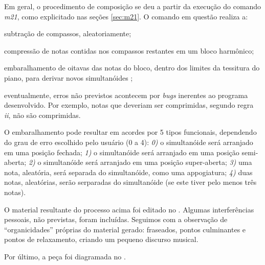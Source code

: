 Em geral, o procedimento de composição se deu a partir da execução do comando \emph{m21}, como explicitado nas seções \ref{sec:m21}. O comando em questão realiza a:\begin{inparaenum}
\item subtração de compassos, aleatoriamente;
\item compressão de notas contidas nos compassos restantes em um bloco harmônico;
\item embaralhamento de oitavas das notas do bloco, dentro dos limites da tessitura do piano, para derivar novos simultanóides \cite{koellreutter_introducao_1987};
\item eventualmente, erros não previstos acontecem por \emph{bugs} inerentes ao programa desenvolvido. Por exemplo, notas que deveriam ser comprimidas, segundo regra \emph{ii}, não são comprimidas.
\end{inparaenum}

O embaralhamento pode resultar em acordes por 5 tipos funcionais, dependendo do grau de erro escolhido pelo usuário (0 a 4): \emph{0)} o simultanóide será arranjado em uma posição fechada; \emph{1)} o simultanóide será arranjado em uma posição semi-aberta; \emph{2)} o simultanóide será arranjado em uma posição super-aberta; \emph{3)} uma nota, aleatória, será separada do simultanóide, como uma appogiatura; \emph{4)} duas notas, aleatórias, serão serparadas do simultanóide (se este tiver pelo menos três notas).

O material resultante do processo acima foi editado no \cite{musescore_2015}. Algumas interferências pessoais, não previstas, foram incluídas. Seguimos com a observação de ``organicidades'' próprias do material gerado: fraseados, pontos culminantes e pontos de relaxamento, criando um pequeno discurso musical.

Por último, a peça foi diagramada no \cite{lilypond_2015}.